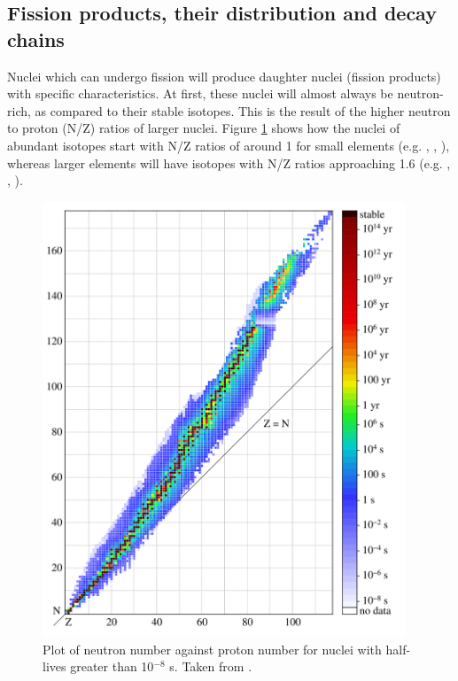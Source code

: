 \subsection{Fission products, their distribution and decay chains}

Nuclei which can undergo fission will produce daughter nuclei (fission products) with specific characteristics. At first, these nuclei will almost always be neutron-rich, as compared to their stable isotopes. This is the result of the higher neutron to proton (N/Z) ratios of larger nuclei. Figure \ref{figure:NZcurve} shows how the nuclei of abundant isotopes start with N/Z ratios of around 1 for small elements (e.g. , , ), whereas larger elements will have isotopes with N/Z ratios approaching 1.6 (e.g. , , ).

\begin{figure}[ht]
\centering
\includegraphics[height=13cm]{images/Isotopes_and_half-life.png}
\caption[Plot of neutron number against proton number for nuclei with half-lives greater than 10${^{-8}}$ s.]{Plot of neutron number against proton number for nuclei with half-lives greater than 10${^{-8}}$ s. Taken from \cite{BenRG}.}
\label{figure:NZcurve}
\end{figure} 

